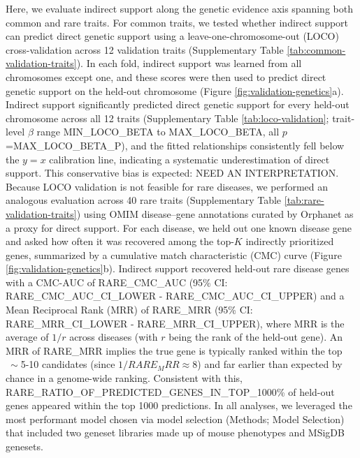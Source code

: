 Here, we evaluate indirect support along the genetic evidence axis spanning both common and rare traits. For common traits, we tested whether indirect support can predict direct genetic support using a leave-one-chromosome-out (LOCO) cross-validation across 12 validation traits (Supplementary Table \ref{tab:common-validation-traits}). In each fold, indirect support was learned from all chromosomes except one, and these scores were then used to predict direct genetic support on the held-out chromosome (Figure \ref{fig:validation-genetics}a). Indirect support significantly predicted direct genetic support for every held-out chromosome across all 12 traits (Supplementary Table \ref{tab:loco-validation}; trait-level $\beta$ range {{MIN_LOCO_BETA}} to {{MAX_LOCO_BETA}}, all $p$={{MAX_LOCO_BETA_P}}), and the fitted relationships consistently fell below the $y=x$ calibration line, indicating a systematic underestimation of direct support. This conservative bias is expected: NEED AN INTERPRETATION. Because LOCO validation is not feasible for rare diseases, we performed an analogous evaluation across 40 rare traits (Supplementary Table \ref{tab:rare-validation-traits}) using OMIM disease–gene annotations curated by Orphanet as a proxy for direct support. For each disease, we held out one known disease gene and asked how often it was recovered among the top-$K$ indirectly prioritized genes, summarized by a cumulative match characteristic (CMC) curve (Figure \ref{fig:validation-genetics}b). Indirect support recovered held-out rare disease genes with a CMC-AUC of {{RARE_CMC_AUC}} (95\% CI: {{RARE_CMC_AUC_CI_LOWER}} - {{RARE_CMC_AUC_CI_UPPER}}) and a Mean Reciprocal Rank (MRR) of {{RARE_MRR}} (95\% CI: {{RARE_MRR_CI_LOWER}} - {{RARE_MRR_CI_UPPER}}), where MRR is the average of $1/r$ across diseases (with $r$ being the rank of the held-out gene). An MRR of {{RARE_MRR}} implies the true gene is typically ranked within the top $~\sim$5-10 candidates (since $1/{{RARE_MRR}}\approx 8$) and far earlier than expected by chance in a genome-wide ranking. Consistent with this, {{RARE_RATIO_OF_PREDICTED_GENES_IN_TOP_1000}}\% of held-out genes appeared within the top 1000 predictions. In all analyses, we leveraged the most performant model chosen via model selection (Methods; Model Selection) that included two geneset libraries made up of mouse phenotypes and MSigDB genesets.

